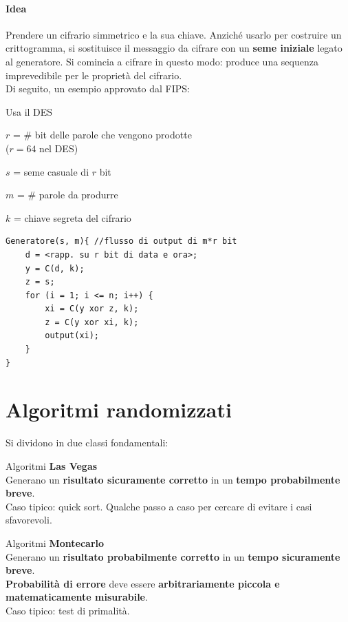 \documentclass[10pt]{book}
\begin{document}
\paragraph{Idea} Prendere un cifrario simmetrico e la sua chiave. Anziché usarlo per costruire un crittogramma, si sostituisce il messaggio da cifrare con un \textbf{seme iniziale} legato al generatore. Si comincia a cifrare in questo modo: produce una sequenza imprevedibile per le proprietà del cifrario.\\
Di seguito, un esempio approvato dal FIPS:
\begin{multicols}{2}
\begin{list}{}{}
	\item Usa il DES
	\item $r$ = \# bit delle parole che vengono prodotte\\($r = 64$ nel DES)
	\item $s$ = seme casuale di $r$ bit
	\item $m$ = \# parole da produrre
	\item $k$ = chiave segreta del cifrario
\end{list}
\columnbreak
\begin{lstlisting}
Generatore(s, m){ //flusso di output di m*r bit
	d = <rapp. su r bit di data e ora>;
	y = C(d, k);
	z = s;
	for (i = 1; i <= n; i++) {
		xi = C(y xor z, k);
		z = C(y xor xi, k);
		output(xi);
	}
}
\end{lstlisting}
\end{multicols}
\section{Algoritmi randomizzati}
Si dividono in due classi fondamentali:
\begin{list}{}{}
	\item Algoritmi \textbf{Las Vegas}\\
	Generano un \textbf{risultato sicuramente corretto} in un \textbf{tempo probabilmente breve}.\\
	Caso tipico: quick sort. Qualche passo a caso per cercare di evitare i casi sfavorevoli.
	\item Algoritmi \textbf{Montecarlo}\\
	Generano un \textbf{risultato probabilmente corretto} in un \textbf{tempo sicuramente breve}.\\
	\textbf{Probabilità di errore} deve essere \textbf{arbitrariamente piccola e matematicamente misurabile}.\\
	Caso tipico: test di primalità.
\end{list}
\end{document}
